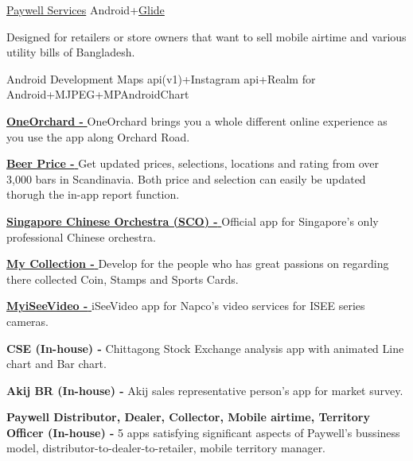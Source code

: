 \begin{projectentries}
    \projectentry 
    {\href{https://play.google.com/store/apps/details?id=com.cloudwell.paywell.services}{Paywell Services}} 
    {Android+{\href{https://github.com/bumptech/glide}{Glide}}}
    {
      \begin{projectitems} %
        \item {Designed for retailers or store owners that want to sell mobile airtime and various utility bills of Bangladesh.}
      \end{projectitems}
    }

    \projectentry 
    {Android Development} 
    {Maps api(v1)+Instagram api+Realm for Android+MJPEG+MPAndroidChart}
    {
      \begin{projectitems} %
        \item {{\href{https://play.google.com/store/apps/details?id=com.orba.OneOrchard}{\textbf{OneOrchard - }}}
        OneOrchard brings you a whole different online experience as you use the app along Orchard Road.}
        \item {{\href{https://annanovas.com/portfolio/beer-prices-android/}{\textbf{Beer Price - }}}
        Get updated prices, selections, locations and rating from over 3,000 bars in Scandinavia. Both price and selection can easily be 
        updated thorugh the in-app report function.}  
        \item {{\href{https://play.google.com/store/apps/details?id=com.SingaporeChineseOrchestra.SCO}{\textbf{Singapore Chinese Orchestra (SCO) - }}}
        Official app for Singapore’s only professional Chinese orchestra.}  
        \item {{\href{https://annanovas.com/portfolio/my-collection/}{\textbf{My Collection - }}}
        Develop for the people who has great passions on regarding there collected Coin, Stamps and Sports Cards.}  
        \item {{\href{https://play.google.com/store/apps/details?id=com.napco.uidealer.myiseevideo}{\textbf{MyiSeeVideo - }}}
        iSeeVideo app for Napco's video services for ISEE series cameras.}  
        \item {\textbf{CSE (In-house) - }
        Chittagong Stock Exchange analysis app with animated Line chart and Bar chart.}  
        \item {\textbf{Akij BR (In-house) - }
        Akij sales representative person's app for market survey.}  
        \item {\textbf{Paywell Distributor, Dealer, Collector, Mobile airtime, Territory Officer (In-house) - }
        5 apps satisfying significant aspects of Paywell's bussiness model, distributor-to-dealer-to-retailer, mobile territory manager.}  
      \end{projectitems}
    }
    


\end{projectentries}
